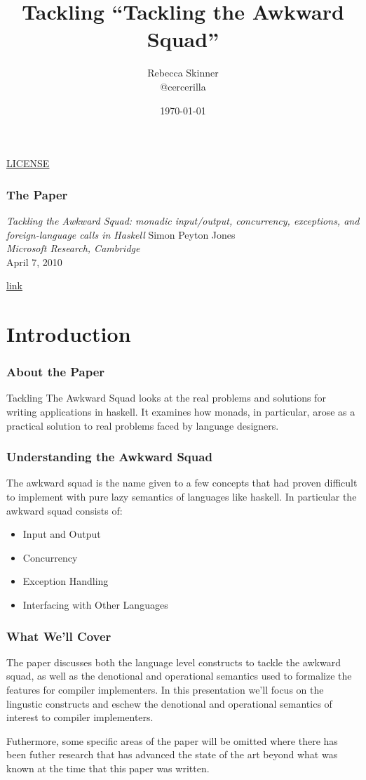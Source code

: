 \documentclass{beamer}
\title{Tackling ``Tackling the Awkward Squad''}
\subtitle{}
\author{Rebecca Skinner\\ \small{@cercerilla}}
\institute{Papers We Love St. Louis}
\date{\today}
\newcommand{\chref}[3] {
  {\color{#1} \href{#2}{\underline{#3}}}
}
\begin{document}
\begin{frame}
  \titlepage{}
  \begin{center}
    \small{\chref{blue}{http://creativecommons.org/licenses/by-sa/4.0/}{LICENSE}}
  \end{center}
\end{frame}

\begin{frame}
  \frametitle{The Paper}
  \begin{center}
    \emph{Tackling the Awkward Squad: monadic input/output, concurrency, exceptions, and foreign-language calls in Haskell}
    \vfill
    Simon Peyton Jones\\
    \emph{Microsoft Research, Cambridge}\\
    April 7, 2010
    \vfill
\chref{blue}{https://www.microsoft.com/en-us/research/wp-content/uploads/2016/07/mark.pdf}{link}
\end{center}
\end{frame}

\section{Introduction}
\begin{frame}
  \frametitle{About the Paper}
  Tackling The Awkward Squad looks at the real problems and solutions
  for writing applications in haskell.  It examines how monads, in
  particular, arose as a practical solution to real problems faced by
  language designers.
\end{frame}

\begin{frame}
  \frametitle{Understanding the Awkward Squad}
  The awkward squad is the name given to a few concepts that had
  proven difficult to implement with pure lazy semantics of languages
  like haskell.  In particular the awkward squad consists of:
  \begin{itemize}
    \item Input and Output
    \item Concurrency
    \item Exception Handling
    \item Interfacing with Other Languages
  \end{itemize}
\end{frame}
\begin{frame}
  \frametitle{What We'll Cover}
  The paper discusses both the language level constructs to tackle the
  awkward squad, as well as the denotional and operational semantics
  used to formalize the features for compiler implementers.  In this
  presentation we'll focus on the lingustic constructs and eschew the
  denotional and operational semantics of interest to compiler
  implementers.

  Futhermore, some specific areas of the paper will be omitted where
  there has been futher research that has advanced the state of the
  art beyond what was known at the time that this paper was written.
\end{frame}
\end{document}

